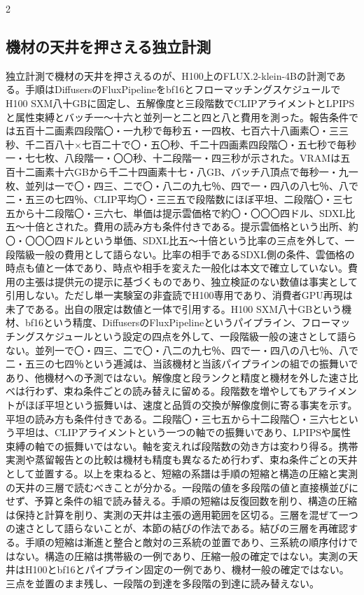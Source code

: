 \documentclass[lualatex,a4paper,10pt]{jlreq}
\begin{document}
\begin{multicols}{2}
\subsection{機材の天井を押さえる独立計測}
独立計測で機材の天井を押さえるのが、H100上のFLUX.2-klein-4Bの計測である。手順はDiffusersのFluxPipelineをbf16とフローマッチングスケジュールでH100 SXM八十GBに固定し、五解像度と三段階数でCLIPアライメントとLPIPSと属性束縛とバッチ一〜十六と並列一と二と四と八と費用を測った\autocite{btd137}。報告条件では五百十二画素四段階〇・一九秒で毎秒五・一四枚、七百六十八画素〇・三三秒、千二百八十×七百二十で〇・五〇秒、千二十四画素四段階〇・五七秒で毎秒一・七七枚、八段階一・〇〇秒、十二段階一・四三秒が示された。VRAMは五百十二画素十六GBから千二十四画素十七・八GB、バッチ八頂点で毎秒一・九一枚、並列は一で〇・四三、二で〇・八二の九七％、四で一・四八の八七％、八で二・五三の七四％、CLIP平均〇・三三五で段階数にほぼ平坦、二段階〇・三七五から十二段階〇・三六七、単価は提示雲価格で約〇・〇〇〇四ドル、SDXL比五〜十倍とされた\autocite{btd137}。費用の読み方も条件付きである。提示雲価格という出所、約〇・〇〇〇四ドルという単価、SDXL比五〜十倍という比率の三点を外して、一段階級一般の費用として語らない。比率の相手であるSDXL側の条件、雲価格の時点も値と一体であり、時点や相手を変えた一般化は本文で確立していない。費用の主張は提供元の提示に基づくものであり、独立検証のない数値は事実として引用しない\autocite{btd137}。ただし単一実験室の非査読でH100専用であり、消費者GPU再現は未了である\autocite{btd137}。出自の限定は数値と一体で引用する。H100 SXM八十GBという機材、bf16という精度、DiffusersのFluxPipelineというパイプライン、フローマッチングスケジュールという設定の四点を外して、一段階級一般の速さとして語らない。並列一で〇・四三、二で〇・八二の九七％、四で一・四八の八七％、八で二・五三の七四％という逓減は、当該機材と当該パイプラインの組での振舞いであり、他機材への予測ではない\autocite{btd137}。解像度と段ランクと精度と機材を外した速さ比べは行わず、束ね条件ごとの読み替えに留める。段階数を増やしてもアライメントがほぼ平坦という振舞いは、速度と品質の交換が解像度側に寄る事実を示す。平坦の読み方も条件付きである。二段階〇・三七五から十二段階〇・三六七という平坦は、CLIPアライメントという一つの軸での振舞いであり、LPIPSや属性束縛の軸での振舞いではない。軸を変えれば段階数の効き方は変わり得る\autocite{btd137}。携帯実測や蒸留報告との比較は機材も精度も異なるため行わず、束ね条件ごとの天井として並置する。以上を束ねると、短縮の系譜は手順の短縮と構造の圧縮と実測の天井の三層で読むべきことが分かる\autocite{btd078,btd079,btd080,btd081,btd082,btd137}。一段階の値を多段階の値と直接横並びにせず、予算と条件の組で読み替える。手順の短縮は反復回数を削り、構造の圧縮は保持と計算を削り、実測の天井は主張の適用範囲を区切る。三層を混ぜて一つの速さとして語らないことが、本節の結びの作法である。結びの三層を再確認する。手順の短縮は漸進と整合と敵対の三系統の並置であり、三系統の順序付けではない。構造の圧縮は携帯級の一例であり、圧縮一般の確定ではない。実測の天井はH100とbf16とパイプライン固定の一例であり、機材一般の確定ではない。三点を並置のまま残し、一段階の到達を多段階の到達に読み替えない\autocite{btd078,btd079,btd080,btd081,btd082,btd137}。
\end{multicols}
\end{document}
